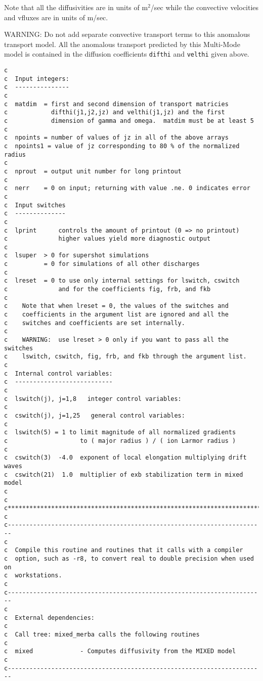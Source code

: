 Note that all the diffusivities are in units of m$^2$/sec while the
convective velocities and vfluxes are in units of m/sec.

WARNING:  Do not add separate convective transport terms to this
anomalous transport model.  All the anomalous transport 
predicted by this Multi-Mode model is contained
in the diffusion coefficients {\tt difthi} and {\tt velthi} given
above.

\begin{verbatim}
c
c  Input integers:
c  ---------------
c
c  matdim  = first and second dimension of transport matricies
c            difthi(j1,j2,jz) and velthi(j1,jz) and the first 
c            dimension of gamma and omega.  matdim must be at least 5
c
c  npoints = number of values of jz in all of the above arrays
c  npoints1 = value of jz corresponding to 80 % of the normalized radius
c
c  nprout  = output unit number for long printout
c
c  nerr    = 0 on input; returning with value .ne. 0 indicates error
c
c  Input switches
c  --------------
c
c  lprint      controls the amount of printout (0 => no printout)
c              higher values yield more diagnostic output
c
c  lsuper  > 0 for supershot simulations
c          = 0 for simulations of all other discharges
c
c  lreset  = 0 to use only internal settings for lswitch, cswitch
c              and for the coefficients fig, frb, and fkb
c
c    Note that when lreset = 0, the values of the switches and
c    coefficients in the argument list are ignored and all the 
c    switches and coefficients are set internally.
c
c    WARNING:  use lreset > 0 only if you want to pass all the switches
c    lswitch, cswitch, fig, frb, and fkb through the argument list.
c
c  Internal control variables:
c  ---------------------------
c
c  lswitch(j), j=1,8   integer control variables: 
c
c  cswitch(j), j=1,25   general control variables:
c
c  lswitch(5) = 1 to limit magnitude of all normalized gradients
c                    to ( major radius ) / ( ion Larmor radius )
c
c  cswitch(3)  -4.0  exponent of local elongation multiplying drift waves
c  cswitch(21)  1.0  multiplier of exb stabilization term in mixed model
c
c
c***********************************************************************
c
c-----------------------------------------------------------------------
c
c  Compile this routine and routines that it calls with a compiler 
c  option, such as -r8, to convert real to double precision when used on 
c  workstations.
c
c-----------------------------------------------------------------------
c
c  External dependencies:
c
c  Call tree: mixed_merba calls the following routines
c
c  mixed             - Computes diffusivity from the MIXED model
c
c-----------------------------------------------------------------------


\end{verbatim}
